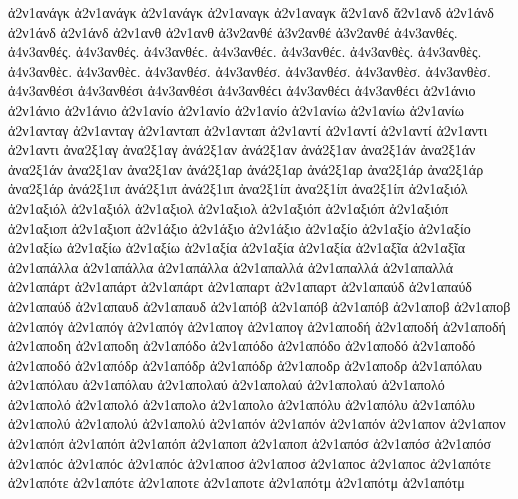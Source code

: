 {ἀ2ν1ανάγκ ἀ2ν1ανάγκ ἀ2ν1ανάγκ   %
ἀ2ν1αναγκ ἀ2ν1αναγκ 
ἄ2ν1ανδ ἄ2ν1ανδ   %
ἀ2ν1άνδ ἀ2ν1άνδ ἀ2ν1άνδ 
ἀ2ν1ανθ ἀ2ν1ανθ   %
ἀ3ν2ανθέ ἀ3ν2ανθέ ἀ3ν2ανθέ   %
ἀ4ν3ανθές. ἀ4ν3ανθές. ἀ4ν3ανθές. ἀ4ν3ανθέϲ. ἀ4ν3ανθέϲ. ἀ4ν3ανθέϲ.   %
ἀ4ν3ανθὲς. ἀ4ν3ανθὲς. ἀ4ν3ανθὲϲ. ἀ4ν3ανθὲϲ. 
ἀ4ν3ανθέσ. ἀ4ν3ανθέσ. ἀ4ν3ανθέσ. 
ἀ4ν3ανθὲσ. ἀ4ν3ανθὲσ. 
ἀ4ν3ανθέσι ἀ4ν3ανθέσι ἀ4ν3ανθέσι ἀ4ν3ανθέϲι ἀ4ν3ανθέϲι ἀ4ν3ανθέϲι 
ἀ2ν1άνιο ἀ2ν1άνιο ἀ2ν1άνιο   %
ἀ2ν1ανίο ἀ2ν1ανίο ἀ2ν1ανίο 
ἀ2ν1ανίω ἀ2ν1ανίω ἀ2ν1ανίω 
ἀ2ν1ανταγ ἀ2ν1ανταγ   %
ἀ2ν1ανταπ ἀ2ν1ανταπ   %
ἀ2ν1αντί ἀ2ν1αντί ἀ2ν1αντί   %
ἀ2ν1αντι ἀ2ν1αντι 
ἀνα2ξ1αγ ἀνα2ξ1αγ   %
ἀνά2ξ1αν ἀνά2ξ1αν ἀνά2ξ1αν   %
ἀνα2ξ1άν ἀνα2ξ1άν ἀνα2ξ1άν 
ἀνα2ξ1αν ἀνα2ξ1αν   %
ἀνά2ξ1αρ ἀνά2ξ1αρ ἀνά2ξ1αρ   %
ἀνα2ξ1άρ ἀνα2ξ1άρ ἀνα2ξ1άρ 
ἀνά2ξ1ιπ ἀνά2ξ1ιπ ἀνά2ξ1ιπ   %
ἀνα2ξ1ίπ ἀνα2ξ1ίπ ἀνα2ξ1ίπ 
ἀ2ν1αξιόλ ἀ2ν1αξιόλ ἀ2ν1αξιόλ   %
ἀ2ν1αξιολ ἀ2ν1αξιολ 
ἀ2ν1αξιόπ ἀ2ν1αξιόπ ἀ2ν1αξιόπ   %
ἀ2ν1αξιοπ ἀ2ν1αξιοπ 
ἀ2ν1άξιο ἀ2ν1άξιο ἀ2ν1άξιο   %
ἀ2ν1αξίο ἀ2ν1αξίο ἀ2ν1αξίο 
ἀ2ν1αξίω ἀ2ν1αξίω ἀ2ν1αξίω 
ἀ2ν1αξία ἀ2ν1αξία ἀ2ν1αξία 
ἀ2ν1αξῖα ἀ2ν1αξῖα 
ἀ2ν1απάλλα ἀ2ν1απάλλα ἀ2ν1απάλλα   %
ἀ2ν1απαλλά ἀ2ν1απαλλά ἀ2ν1απαλλά 
ἀ2ν1απάρτ ἀ2ν1απάρτ ἀ2ν1απάρτ   %
ἀ2ν1απαρτ ἀ2ν1απαρτ 
ἀ2ν1απαύδ ἀ2ν1απαύδ ἀ2ν1απαύδ   %
ἀ2ν1απαυδ ἀ2ν1απαυδ 
ἀ2ν1απόβ ἀ2ν1απόβ ἀ2ν1απόβ   %
ἀ2ν1αποβ ἀ2ν1αποβ 
ἀ2ν1απόγ ἀ2ν1απόγ ἀ2ν1απόγ   %
ἀ2ν1απογ ἀ2ν1απογ 
ἀ2ν1αποδή ἀ2ν1αποδή ἀ2ν1αποδή   %
ἀ2ν1αποδη ἀ2ν1αποδη 
ἀ2ν1απόδο ἀ2ν1απόδο ἀ2ν1απόδο   %
ἀ2ν1αποδό ἀ2ν1αποδό ἀ2ν1αποδό 
ἀ2ν1απόδρ ἀ2ν1απόδρ ἀ2ν1απόδρ   %
ἀ2ν1αποδρ ἀ2ν1αποδρ 
ἀ2ν1απόλαυ ἀ2ν1απόλαυ ἀ2ν1απόλαυ   %
ἀ2ν1απολαύ ἀ2ν1απολαύ ἀ2ν1απολαύ 
ἀ2ν1απολό ἀ2ν1απολό ἀ2ν1απολό   %
ἀ2ν1απολο ἀ2ν1απολο 
ἀ2ν1απόλυ ἀ2ν1απόλυ ἀ2ν1απόλυ   %
ἀ2ν1απολύ ἀ2ν1απολύ ἀ2ν1απολύ 
ἀ2ν1απόν ἀ2ν1απόν ἀ2ν1απόν   %
ἀ2ν1απον ἀ2ν1απον 
ἀ2ν1απόπ ἀ2ν1απόπ ἀ2ν1απόπ   %
ἀ2ν1αποπ ἀ2ν1αποπ 
ἀ2ν1απόσ ἀ2ν1απόσ ἀ2ν1απόσ ἀ2ν1απόϲ ἀ2ν1απόϲ ἀ2ν1απόϲ   %
ἀ2ν1αποσ ἀ2ν1αποσ ἀ2ν1αποϲ ἀ2ν1αποϲ 
ἀ2ν1απότε ἀ2ν1απότε ἀ2ν1απότε   %
ἀ2ν1αποτε ἀ2ν1αποτε 
ἀ2ν1απότμ ἀ2ν1απότμ ἀ2ν1απότμ   %
}

